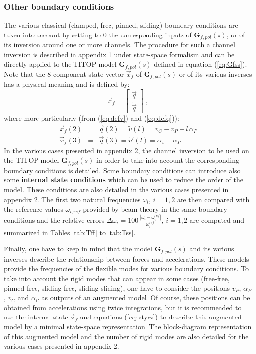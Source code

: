 \subsubsection{Other boundary conditions}
The various classical (clamped, free, pinned, sliding) boundary conditions are taken into account by setting to $0$ the corresponding inputs of $\mathbf{G}_{f,pol}(s)$, or of its inversion around one or more channels. The procedure for such a channel inversion is described in appendix 1 under state-space formalism and can be directly applied to the TITOP model  $\mathbf{G}_{f,pol}(s)$ defined in equation (\ref{eq:Gfss}). Note that the $8$-component state vector $\vec{x}_f$ of $\mathbf{G}_{f,pol}(s)$ or of its various inverses has a physical meaning and is defined by:
\[
\vec{x}_f=\left[ \begin {array}{c} \vec{q}  \\ \dot{\vec{q}} \end{array}\right]\;,
\]
where more particularly (from (\ref{eq:defv}) and (\ref{eq:defq})):
\begin{eqnarray}\label{eq:xtyrz}
\vec{x}_f(2)&=& \vec{q}(2)= \widetilde{v}(l) = v_C-v_P-l\,\alpha_P\\ \nonumber
\vec{x}_f(3)&=& \vec{q}(3)= \widetilde{v}'(l)= \alpha_c-\alpha_P\;.
\end{eqnarray}
In the various cases presented in appendix 2, the channel inversion to be used on the TITOP model $\mathbf{G}_{f,pol}(s)$ in order to take into account the corresponding boundary conditions is detailed.  Some boundary conditions can introduce also some \textbf{internal state conditions} which can be used to reduce the order of the model. These conditions are also detailed in the various cases presented in appendix 2. The first two natural frequencies $\omega_i$, $i=1,2$ are then compared with the reference values $\omega_{i,ref}$ provided by beam theory \cite{bishop1979mechanics} in the same boundary conditions and the relative errors $\Delta \omega_i=100\,\frac{|\omega_i-\omega_i^{ref}|}{\omega_i^{ref}}$, $i=1,2$ are computed and summarized in Tables \ref{tab:Tff} to \ref{tab:Tss}.

Finally, one have to keep in mind that the model $\mathbf{G}_{f,pol}(s)$ and its various inverses describe the relationship between forces and accelerations. These models provide the frequencies of the flexible modes for various boundary conditions. To take into account the rigid modes that can appear in some cases (free-free, pinned-free, sliding-free, sliding-sliding), one have to consider the positions $v_P$, $\alpha_P$, $v_C$ and $\alpha_C$ as outputs of an augmented model. Of course, these positions can be obtained from accelerations using twice integrations, but it is recommended to use the internal state $\vec{x}_f$ and equations (\ref{eq:xtyrz}) to describe this augmented model by a minimal state-space representation. The block-diagram representation of this augmented model and the number of rigid modes are also detailed for the various cases presented in appendix 2.


